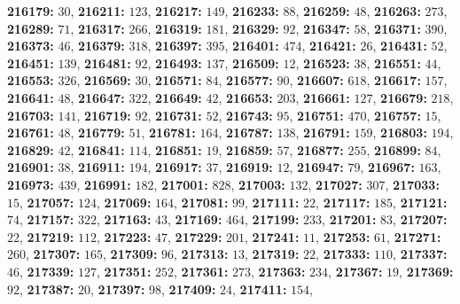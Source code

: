 \textsf{\bfseries 216179:} $30$, \textsf{\bfseries 216211:} $123$, \textsf{\bfseries 216217:} $149$, \textsf{\bfseries 216233:} $88$, \textsf{\bfseries 216259:} $48$, \textsf{\bfseries 216263:} $273$, \textsf{\bfseries 216289:} $71$, \textsf{\bfseries 216317:} $266$, \textsf{\bfseries 216319:} $181$, \textsf{\bfseries 216329:} $92$, \textsf{\bfseries 216347:} $58$, \textsf{\bfseries 216371:} $390$, \textsf{\bfseries 216373:} $46$, \textsf{\bfseries 216379:} $318$, \textsf{\bfseries 216397:} $395$, \textsf{\bfseries 216401:} $474$, \textsf{\bfseries 216421:} $26$, \textsf{\bfseries 216431:} $52$, \textsf{\bfseries 216451:} $139$, \textsf{\bfseries 216481:} $92$, \textsf{\bfseries 216493:} $137$, \textsf{\bfseries 216509:} $12$, \textsf{\bfseries 216523:} $38$, \textsf{\bfseries 216551:} $44$, \textsf{\bfseries 216553:} $326$, \textsf{\bfseries 216569:} $30$, \textsf{\bfseries 216571:} $84$, \textsf{\bfseries 216577:} $90$, \textsf{\bfseries 216607:} $618$, \textsf{\bfseries 216617:} $157$, \textsf{\bfseries 216641:} $48$, \textsf{\bfseries 216647:} $322$, \textsf{\bfseries 216649:} $42$, \textsf{\bfseries 216653:} $203$, \textsf{\bfseries 216661:} $127$, \textsf{\bfseries 216679:} $218$, \textsf{\bfseries 216703:} $141$, \textsf{\bfseries 216719:} $92$, \textsf{\bfseries 216731:} $52$, \textsf{\bfseries 216743:} $95$, \textsf{\bfseries 216751:} $470$, \textsf{\bfseries 216757:} $15$, \textsf{\bfseries 216761:} $48$, \textsf{\bfseries 216779:} $51$, \textsf{\bfseries 216781:} $164$, \textsf{\bfseries 216787:} $138$, \textsf{\bfseries 216791:} $159$, \textsf{\bfseries 216803:} $194$, \textsf{\bfseries 216829:} $42$, \textsf{\bfseries 216841:} $114$, \textsf{\bfseries 216851:} $19$, \textsf{\bfseries 216859:} $57$, \textsf{\bfseries 216877:} $255$, \textsf{\bfseries 216899:} $84$, \textsf{\bfseries 216901:} $38$, \textsf{\bfseries 216911:} $194$, \textsf{\bfseries 216917:} $37$, \textsf{\bfseries 216919:} $12$, \textsf{\bfseries 216947:} $79$, \textsf{\bfseries 216967:} $163$, \textsf{\bfseries 216973:} $439$, \textsf{\bfseries 216991:} $182$, \textsf{\bfseries 217001:} $828$, \textsf{\bfseries 217003:} $132$, \textsf{\bfseries 217027:} $307$, \textsf{\bfseries 217033:} $15$, \textsf{\bfseries 217057:} $124$, \textsf{\bfseries 217069:} $164$, \textsf{\bfseries 217081:} $99$, \textsf{\bfseries 217111:} $22$, \textsf{\bfseries 217117:} $185$, \textsf{\bfseries 217121:} $74$, \textsf{\bfseries 217157:} $322$, \textsf{\bfseries 217163:} $43$, \textsf{\bfseries 217169:} $464$, \textsf{\bfseries 217199:} $233$, \textsf{\bfseries 217201:} $83$, \textsf{\bfseries 217207:} $22$, \textsf{\bfseries 217219:} $112$, \textsf{\bfseries 217223:} $47$, \textsf{\bfseries 217229:} $201$, \textsf{\bfseries 217241:} $11$, \textsf{\bfseries 217253:} $61$, \textsf{\bfseries 217271:} $260$, \textsf{\bfseries 217307:} $165$, \textsf{\bfseries 217309:} $96$, \textsf{\bfseries 217313:} $13$, \textsf{\bfseries 217319:} $22$, \textsf{\bfseries 217333:} $110$, \textsf{\bfseries 217337:} $46$, \textsf{\bfseries 217339:} $127$, \textsf{\bfseries 217351:} $252$, \textsf{\bfseries 217361:} $273$, \textsf{\bfseries 217363:} $234$, \textsf{\bfseries 217367:} $19$, \textsf{\bfseries 217369:} $92$, \textsf{\bfseries 217387:} $20$, \textsf{\bfseries 217397:} $98$, \textsf{\bfseries 217409:} $24$, \textsf{\bfseries 217411:} $154$, 
